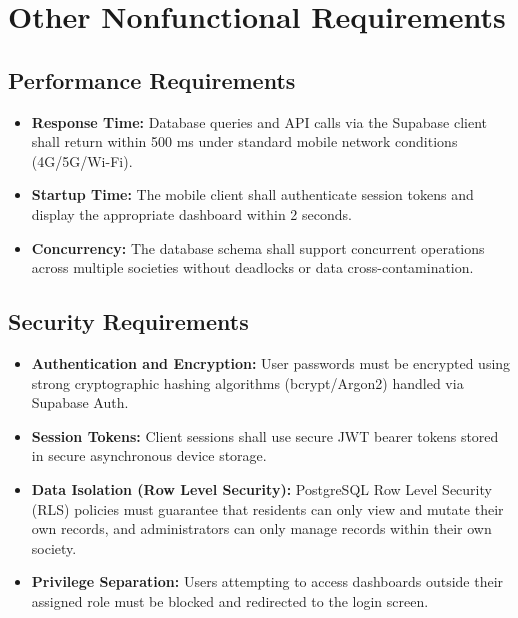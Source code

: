 \documentclass[a4paper,10pt]{scrartcl}
\numberwithin{figure}{section}
\begin{document}
\newpage
\section{Other Nonfunctional Requirements}
\subsection{Performance Requirements}
\begin{itemize}
\item \textbf{Response Time:} Database queries and API calls via the Supabase client shall return within 500 ms under standard mobile network conditions (4G/5G/Wi-Fi).
\item \textbf{Startup Time:} The mobile client shall authenticate session tokens and display the appropriate dashboard within 2 seconds.
\item \textbf{Concurrency:} The database schema shall support concurrent operations across multiple societies without deadlocks or data cross-contamination.
\end{itemize}

\subsection{Security Requirements}
\begin{itemize}
\item \textbf{Authentication and Encryption:} User passwords must be encrypted using strong cryptographic hashing algorithms (bcrypt/Argon2) handled via Supabase Auth.
\item \textbf{Session Tokens:} Client sessions shall use secure JWT bearer tokens stored in secure asynchronous device storage.
\item \textbf{Data Isolation (Row Level Security):} PostgreSQL Row Level Security (RLS) policies must guarantee that residents can only view and mutate their own records, and administrators can only manage records within their own society.
\item \textbf{Privilege Separation:} Users attempting to access dashboards outside their assigned role must be blocked and redirected to the login screen.
\end{itemize}
\end{document}
